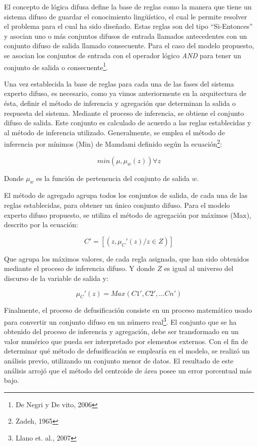 \documentclass[a4paper, 11pt, titlepage]{article}
\begin{document}
        El concepto de lógica difusa define la base de reglas como la manera que tiene un sistema difuso 
        de guardar el conocimiento lingüístico, el cual le permite resolver el problema para el cual ha 
        sido diseñado. Estas reglas son del tipo “Si-Entonces” y asocian uno o más conjuntos difusos de 
        entrada llamados antecedentes con un conjunto difuso de salida llamado consecuente. Para el caso 
        del modelo propuesto, se asocian los conjuntos de entrada con el operador lógico \textit{AND} para tener 
        un conjunto de salida o consecuente\footnote{
            De Negri y De vito, 2006
        }.

        Una vez establecida la base de reglas para cada una de las fases del sistema experto difuso, 
        es necesario, como ya vimos anteriormente en la arquitectura de ésta, definir el método de 
        inferencia y agregación que determinan la salida o respuesta del sistema. Mediante el proceso de 
        inferencia, se obtiene el conjunto difuso de salida. Este conjunto es calculado de acuerdo a las
        reglas establecidas y al método de inferencia utilizado. Generalmente, se emplea el método de 
        inferencia por mínimos (Min) de Mamdami definido según la ecuación\footnote{
            Zadeh, 1965
        }:

        \[
            min(\mu, \mu_w(z)) \forall z    
        \]

        Donde $\mu_w$ es la función de pertenencia del conjunto de salida $w$.

        El método de agregado agrupa todos los conjuntos de salida, de cada una de las reglas establecidas, 
        para obtener un único conjunto difuso. Para el modelo experto difuso propuesto, se utiliza el método 
        de agregación por máximos (Max), descrito por la ecuación:
        
        \[
            C' = [(z, \mu_C' (z) / z \in Z)]    
        \]

        Que agrupa los máximos valores, de cada regla asignada, que han sido obtenidos mediante el proceso 
        de inferencia difuso. Y donde $Z$ es igual al universo del discurso de la variable de salida y:
        
        \[
            \mu_C' (z) = Max(C1', C2',... Cn')    
        \]

        Finalmente, el proceso de defusificación consiste en un proceso matemático usado para convertir 
        un conjunto difuso en un número real\footnote{
            Llano et. al., 2007
        }. El conjunto que se ha obtenido del proceso de inferencia y agregación, debe ser transformado 
        en un valor numérico que pueda ser interpretado por elementos externos. Con el fin de determinar 
        qué método de defusificación se emplearía en el modelo, se realizó un análisis previo, utilizando
        un conjunto menor de datos. El resultado de este análisis arrojó que el método del centroide de 
        área posee un error porcentual más bajo.
\end{document}
